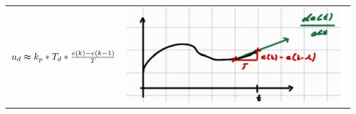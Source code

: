 \documentclass[
  10pt,
  a4paper,
  onecolumn]{article}
\numberwithin{equation}{section}
\begin{document}
\begin{longtable}[]{@{}
  >{\raggedright\arraybackslash}p{}
  >{\raggedright\arraybackslash}p{}@{}}
\toprule\noalign{}
\endhead
\bottomrule\noalign{}
\endlastfoot
\(                                                   
 u_d \thickapprox k_p * T_d * \frac{e(k) - e(k-1)}{T}  
 \) & \includegraphics{images/IAS/D-Anteil.png} \\
\end{longtable}
\end{document}
